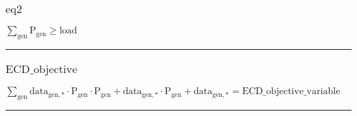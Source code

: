 \documentclass[11pt]{article}
\begin{document}
\subsubsection*{\begin{math}\text{eq2}\end{math}}
\begin{math}
\displaystyle \sum_{\text{gen}} \text{P}_{\text{gen}} \geq \text{load}
\end{math}
\vspace{5pt}
\hrule
\subsubsection*{\begin{math}\text{ECD\_objective}\end{math}}
\begin{math}
\displaystyle \sum_{\text{gen}} \text{data}_{\text{gen},*} \cdot \text{P}_{\text{gen}} \cdot \text{P}_{\text{gen}} + \text{data}_{\text{gen},*} \cdot \text{P}_{\text{gen}} + \text{data}_{\text{gen},*} = \text{ECD\_objective\_variable}
\end{math}
\vspace{5pt}
\hrule
\bigskip
\end{document}
